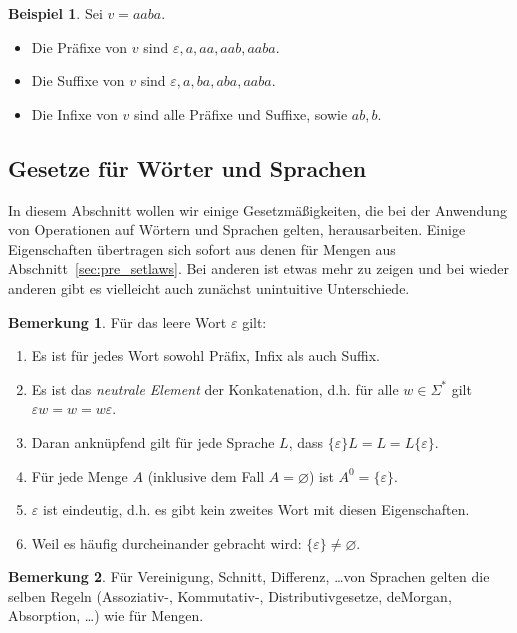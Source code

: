 \documentclass[11pt, a4paper]{article}
\theoremstyle{definition}
\newtheorem{example}[definition]{Beispiel}
\newtheorem*{remark*}{Bemerkung}
\theoremstyle{plain}
\numberwithin{equation}{section}
\let\emptyset\varnothing
\begin{document}
\begin{example}
	Sei $v = aaba$.
	\begin{itemize}
		\item Die Präfixe von $v$ sind $\varepsilon, a, aa, aab, aaba$.
		\item Die Suffixe von $v$ sind $\varepsilon, a, ba, aba, aaba$.
		\item Die Infixe von $v$ sind alle Präfixe und Suffixe, sowie $ab, b$.
	\end{itemize}
\end{example}


\subsection{Gesetze für Wörter und Sprachen}\label{sec:awl_wordlaws}
In diesem Abschnitt wollen wir einige Gesetzmäßigkeiten, die bei der Anwendung von Operationen auf Wörtern und Sprachen gelten, herausarbeiten. Einige Eigenschaften übertragen sich sofort aus denen für Mengen aus Abschnitt~\ref{sec:pre_setlaws}. Bei anderen ist etwas mehr zu zeigen und bei wieder anderen gibt es vielleicht auch zunächst unintuitive Unterschiede.
\begin{remark*}
	Für das leere Wort $\varepsilon$ gilt:
	\begin{enumerate}
		\item Es ist für jedes Wort sowohl Präfix, Infix als auch Suffix.
		\item Es ist das \textit{neutrale Element} der Konkatenation, d.h. für alle $w \in \Sigma^\ast$ gilt $\varepsilon w = w = w \varepsilon$.
		\item Daran anknüpfend gilt für jede Sprache $L$, dass $ \{ \varepsilon \} L = L = L  \{ \varepsilon \}$.
		\item Für jede Menge $A$ (inklusive dem Fall $A = \emptyset$) ist $A^0 = \{ \varepsilon \}$.
		\item $\varepsilon$ ist eindeutig, d.h. es gibt kein zweites Wort mit diesen Eigenschaften.
		\item Weil es häufig durcheinander gebracht wird: $\{ \varepsilon \} \neq \emptyset$.
	\end{enumerate}
\end{remark*}

\begin{remark*}
	Für Vereinigung, Schnitt, Differenz, \ldots von Sprachen gelten die selben Regeln (Assoziativ-, Kommutativ-, Distributivgesetze, deMorgan, Absorption, \ldots) wie für Mengen.
\end{remark*}
\end{document}
